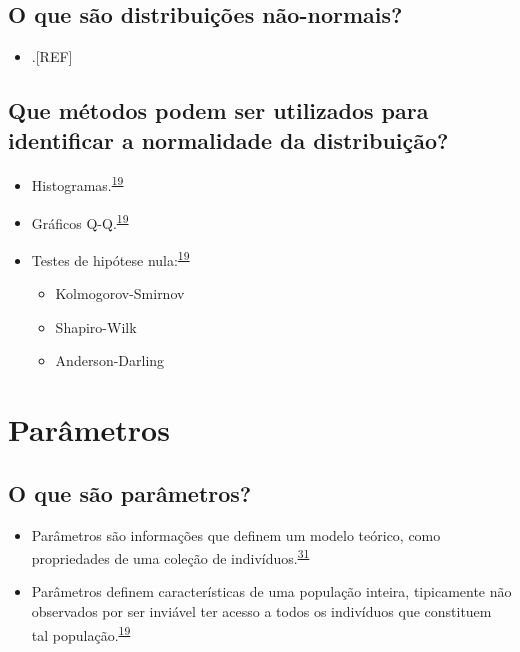 \documentclass[
]{book}
\providecommand{\tightlist}{%
  \setlength{\itemsep}{0pt}\setlength{\parskip}{0pt}}
\begin{document}
\hypertarget{o-que-suxe3o-distribuiuxe7uxf5es-nuxe3o-normais}{%
\subsection{O que são distribuições não-normais?}\label{o-que-suxe3o-distribuiuxe7uxf5es-nuxe3o-normais}}

\begin{itemize}
\tightlist
\item
  .{[}REF{]}
\end{itemize}

\hypertarget{que-muxe9todos-podem-ser-utilizados-para-identificar-a-normalidade-da-distribuiuxe7uxe3o}{%
\subsection{Que métodos podem ser utilizados para identificar a normalidade da distribuição?}\label{que-muxe9todos-podem-ser-utilizados-para-identificar-a-normalidade-da-distribuiuxe7uxe3o}}

\begin{itemize}
\item
  Histogramas.\textsuperscript{\protect\hyperlink{ref-vetter2017}{19}}
\item
  Gráficos Q-Q.\textsuperscript{\protect\hyperlink{ref-vetter2017}{19}}
\item
  Testes de hipótese nula:\textsuperscript{\protect\hyperlink{ref-vetter2017}{19}}

  \begin{itemize}
  \item
    Kolmogorov-Smirnov
  \item
    Shapiro-Wilk
  \item
    Anderson-Darling
  \end{itemize}
\end{itemize}

\hypertarget{parametros}{%
\section{Parâmetros}\label{parametros}}

\hypertarget{o-que-suxe3o-paruxe2metros}{%
\subsection{O que são parâmetros?}\label{o-que-suxe3o-paruxe2metros}}

\begin{itemize}
\item
  Parâmetros são informações que definem um modelo teórico, como propriedades de uma coleção de indivíduos.\textsuperscript{\protect\hyperlink{ref-Altman1999}{31}}
\item
  Parâmetros definem características de uma população inteira, tipicamente não observados por ser inviável ter acesso a todos os indivíduos que constituem tal população.\textsuperscript{\protect\hyperlink{ref-vetter2017}{19}}
\end{itemize}
\end{document}
